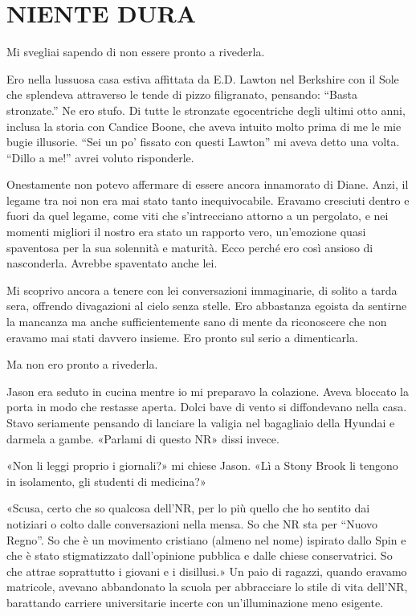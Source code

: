 \chapter{NIENTE DURA}\label{niente-dura}

\hfill\break

Mi svegliai sapendo di non essere pronto a rivederla.

Ero nella lussuosa casa estiva affittata da E.D. Lawton nel Berkshire
con il Sole che splendeva attraverso le tende di pizzo filigranato,
pensando: ``Basta stronzate.'' Ne ero stufo. Di tutte le stronzate
egocentriche degli ultimi otto anni, inclusa la storia con Candice
Boone, che aveva intuito molto prima di me le mie bugie illusorie. ``Sei
un po' fissato con questi Lawton'' mi aveva detto una volta. ``Dillo a
me!'' avrei voluto risponderle.

Onestamente non potevo affermare di essere ancora innamorato di Diane.
Anzi, il legame tra noi non era mai stato tanto inequivocabile. Eravamo
cresciuti dentro e fuori da quel legame, come viti che s'intrecciano
attorno a un pergolato, e nei momenti migliori il nostro era stato un
rapporto vero, un'emozione quasi spaventosa per la sua solennità e
maturità. Ecco perché ero così ansioso di nasconderla. Avrebbe
spaventato anche lei.

Mi scoprivo ancora a tenere con lei conversazioni immaginarie, di solito
a tarda sera, offrendo divagazioni al cielo senza stelle. Ero abbastanza
egoista da sentirne la mancanza ma anche sufficientemente sano di mente
da riconoscere che non eravamo mai stati davvero insieme. Ero pronto sul
serio a dimenticarla.

Ma non ero pronto a rivederla.

\separatorefiori

Jason era seduto in cucina mentre io mi preparavo la colazione. Aveva
bloccato la porta in modo che restasse aperta. Dolci bave di vento si
diffondevano nella casa. Stavo seriamente pensando di lanciare la
valigia nel bagagliaio della Hyundai e darmela a gambe. «Parlami di
questo NR» dissi invece.

«Non li leggi proprio i giornali?» mi chiese Jason. «Lì a Stony Brook li
tengono in isolamento, gli studenti di medicina?»

«Scusa, certo che so qualcosa dell'NR, per lo più quello che ho sentito
dai notiziari o colto dalle conversazioni nella mensa. So che NR sta per
``Nuovo Regno''. So che è un movimento cristiano (almeno nel nome)
ispirato dallo Spin e che è stato stigmatizzato dall'opinione pubblica e
dalle chiese conservatrici. So che attrae soprattutto i giovani e i
disillusi.» Un paio di ragazzi, quando eravamo matricole, avevano
abbandonato la scuola per abbracciare lo stile di vita dell'NR,
barattando carriere universitarie incerte con un'illuminazione meno
esigente.

